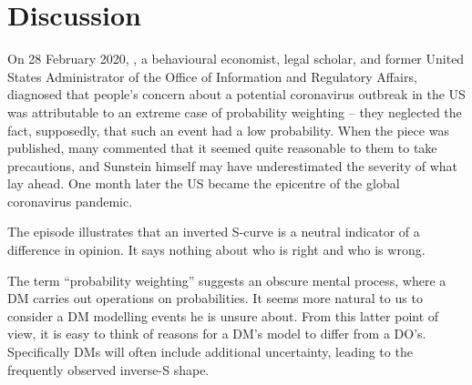 \documentclass[a4paper, 12pt]{article}
\newcommand{\secref}[1]{Sec.~\ref{sec:#1}}
\newcommand{\ie}{{\it i.e.}\ }
\newcommand{\MK}[1]{{\it ***MK: #1 MK***}}
\newcommand{\OP}[1]{{\it ***OP: #1 OP***}}
\begin{document}
\newpage
\section{Discussion}
On 28 February 2020, \citet{Sunstein2020}, a behavioural economist, legal scholar, and former United States Administrator of the Office of Information and Regulatory Affairs, diagnosed that people's concern about a potential coronavirus outbreak in the US was attributable to an extreme case of probability weighting -- they neglected the fact, supposedly, that such an event had a low probability. When the piece was published, many commented that it seemed quite reasonable to them to take precautions, and Sunstein himself may have underestimated the severity of what lay ahead. One month later the US became the epicentre of the global coronavirus pandemic.

The episode illustrates that an inverted S-curve is a neutral indicator of a difference in opinion. It says nothing about who is right and who is wrong.

The term ``probability weighting'' suggests an obscure mental process, where a DM carries out operations on probabilities. It seems more natural to us to consider a DM modelling events he is unsure about. From this latter point of view, it is easy to think of reasons for a DM's model to differ from a DO's. Specifically DMs will often include additional uncertainty, leading to the frequently observed inverse-S shape.


 
\end{document}
